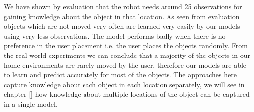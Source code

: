 We have shown by evaluation that the robot needs around 25 observations for gaining knowledge about the object in that location. As seen from evaluation objects which are not moved very often are learned very easily by our models using very less observations. The model performs badly when there is no preference in the user placement i.e. the user places the objects randomly. 
From the real world experiments we can conclude that a majority of the objects in our home environments are rarely moved by the user, therefore our models are able to learn and predict accurately for most of the objects. 
The approaches here capture knowledge about each object in each location separately, we will see in chapter \ref{} how knowledge about multiple locations of the object can be captured in a single model.
